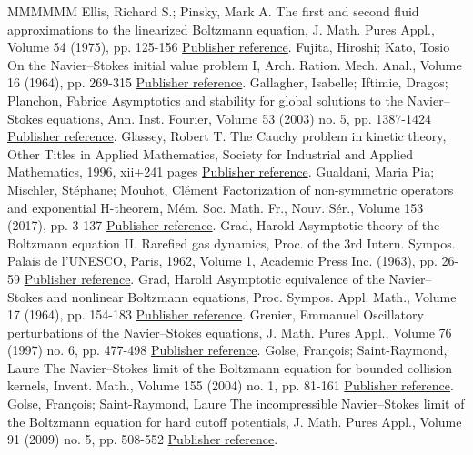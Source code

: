 \documentclass[11pt]{article}
\theoremstyle{definition}
\numberwithin{equation}{section}
\numberwithin{figure}{section}
\numberwithin{table}{section}
\begin{document}
\begin{thebibliography}{MMMMMM}
 Ellis, Richard S.; Pinsky, Mark A. The first and second fluid approximations to the linearized Boltzmann equation, J. Math. Pures Appl., Volume 54 (1975), pp. 125-156 \href{https://ahl.centre-mersenne.org/item/AHL_2020__3__561_0/#Ellis-Pinsky}{Publisher reference}.
 Fujita, Hiroshi; Kato, Tosio On the Navier–Stokes initial value problem I, Arch. Ration. Mech. Anal., Volume 16 (1964), pp. 269-315 \href{https://ahl.centre-mersenne.org/item/AHL_2020__3__561_0/#fujitakato}{Publisher reference}.
 Gallagher, Isabelle; Iftimie, Dragos; Planchon, Fabrice Asymptotics and stability for global solutions to the Navier–Stokes equations, Ann. Inst. Fourier, Volume 53 (2003) no. 5, pp. 1387-1424 \href{https://ahl.centre-mersenne.org/item/AHL_2020__3__561_0/#GIP}{Publisher reference}.
 Glassey, Robert T. The Cauchy problem in kinetic theory, Other Titles in Applied Mathematics, Society for Industrial and Applied Mathematics, 1996, xii+241 pages \href{https://ahl.centre-mersenne.org/item/AHL_2020__3__561_0/#Glassey}{Publisher reference}.
 Gualdani, Maria Pia; Mischler, Stéphane; Mouhot, Clément Factorization of non-symmetric operators and exponential H-theorem, Mém. Soc. Math. Fr., Nouv. Sér., Volume 153 (2017), pp. 3-137 \href{https://ahl.centre-mersenne.org/item/AHL_2020__3__561_0/#GMM}{Publisher reference}.
 Grad, Harold Asymptotic theory of the Boltzmann equation II. Rarefied gas dynamics, Proc. of the 3rd Intern. Sympos. Palais de l’UNESCO, Paris, 1962, Volume 1, Academic Press Inc. (1963), pp. 26-59 \href{https://ahl.centre-mersenne.org/item/AHL_2020__3__561_0/#Gradhydro}{Publisher reference}.
 Grad, Harold Asymptotic equivalence of the Navier–Stokes and nonlinear Boltzmann equations, Proc. Sympos. Appl. Math., Volume 17 (1964), pp. 154-183 \href{https://ahl.centre-mersenne.org/item/AHL_2020__3__561_0/#Grad}{Publisher reference}.
 Grenier, Emmanuel Oscillatory perturbations of the Navier–Stokes equations, J. Math. Pures Appl., Volume 76 (1997) no. 6, pp. 477-498 \href{https://ahl.centre-mersenne.org/item/AHL_2020__3__561_0/#Grenier}{Publisher reference}.
 Golse, François; Saint-Raymond, Laure The Navier–Stokes limit of the Boltzmann equation for bounded collision kernels, Invent. Math., Volume 155 (2004) no. 1, pp. 81-161 \href{https://ahl.centre-mersenne.org/item/AHL_2020__3__561_0/#GSR1}{Publisher reference}.
 Golse, François; Saint-Raymond, Laure The incompressible Navier–Stokes limit of the Boltzmann equation for hard cutoff potentials, J. Math. Pures Appl., Volume 91 (2009) no. 5, pp. 508-552 \href{https://ahl.centre-mersenne.org/item/AHL_2020__3__561_0/#GSR2}{Publisher reference}.

\end{thebibliography}
\end{document}
